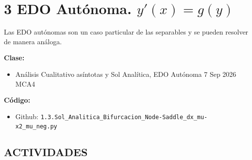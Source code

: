 \section{3 EDO Autónoma. $y'(x)=g(y)$}

\begin{tcolorbox}[enunciado]
Las EDO autónomas son un caso particular de las separables y se pueden resolver de manera análoga.

\vspace{0.2cm}
\textbf{Clase:}
\begin{itemize}[leftmargin=*]
    \item Análisis Cualitativo asíntotas y Sol Analítica, EDO Autónoma 7 Sep 2026 MCA4
\end{itemize}

\textbf{Código:}
\begin{itemize}[leftmargin=*]
    \item Github: \texttt{1.3.Sol\_Analitica\_Bifurcacion\_Node-Saddle\_dx\_mu-x2\_mu\_neg.py}
\end{itemize}
\end{tcolorbox}

\subsection*{ACTIVIDADES}

